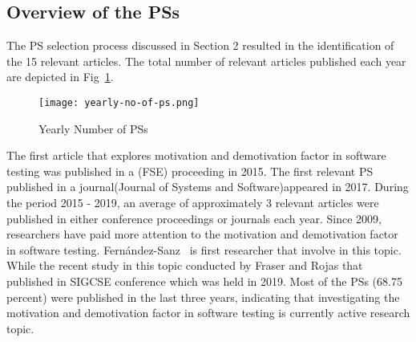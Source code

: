 \documentclass[conference, compsoc, twoside]{IEEEtran}
\begin{document}
\subsection{Overview of the PSs}
The PS selection process discussed in Section 2 resulted in the identification of the 15 relevant articles. The total number of relevant articles published each year are depicted in Fig~\ref{fig:yearly-no-of-ps}. 
\begin{figure}
  \texttt{[image: yearly-no-of-ps.png]}
  \caption{Yearly Number of PSs}
  \label{fig:yearly-no-of-ps}
\end{figure}
The first article that explores motivation and demotivation factor in software testing was published in a (FSE) proceeding in 2015\cite{Beller2015}.
The first relevant PS published in a journal(Journal of Systems and Software)appeared in 2017\cite{Garcia2017}. 
During the period 2015 - 2019, an average of approximately 3 relevant articles were published in either conference proceedings or journals each year. 
Since 2009, researchers have paid more attention to the motivation and demotivation factor in software testing. Fern{\'a}ndez-Sanz~\cite{fernandez2009factors} is first researcher that involve in this topic. 
While the recent study in this topic conducted by Fraser and Rojas \cite{Fraser19} that published in SIGCSE conference which was held in 2019.
Most of the PSs (68.75 percent) were published in the last three years, indicating that investigating the motivation and demotivation factor in software testing is currently active research topic. 
\end{document}
